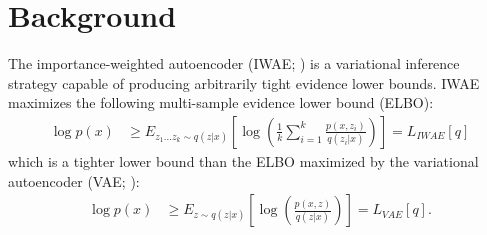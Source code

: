 \documentclass{article} %
\newcommand{\eqname}[1]{\tag*{#1}}
\begin{document}
\section{Background}
The importance-weighted autoencoder (IWAE; \cite{burda2015importance}) is a variational inference strategy capable of producing arbitrarily tight evidence lower bounds. IWAE maximizes the following multi-sample evidence lower bound (ELBO): 
\begin{align} 
    \log p(x) &
    \geq E_{z_{1}...z_{k} \sim q(z|x)} \left[\log\left(  \frac{1}{k}  \sum_{i=1}^k \frac{p(x,z_i)}{q(z_i|x)}  \right)  \right] = L_{IWAE}[q] \label{iwae_elbo}  \eqname{(IWAE ELBO)}
\end{align}
which is a tighter lower bound than the ELBO maximized by the variational autoencoder (VAE; \cite{vae}):
\begin{align}
    \log p(x) & \geq E_{z \sim q(z|x)} \left[ \log\left(\frac{p(x,z)}{q(z|x)}  \right)  \right] = L_{VAE}[q]. \label{vae_elbo} \eqname{(VAE ELBO)}
\end{align}



\end{document}
